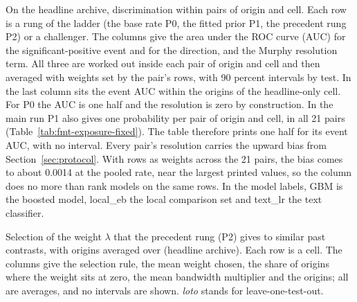 \begin{table}[tp]\centering\scriptsize
\caption{On the headline archive, discrimination within pairs of origin and cell. Each row is a rung of the ladder (the base rate P0, the fitted prior P1, the precedent rung P2) or a challenger. The columns give the area under the ROC curve (AUC) for the significant-positive event and for the direction, and the Murphy resolution term. All three are worked out inside each pair of origin and cell and then averaged with weights set by the pair's rows, with 90 percent intervals by test. In the last column sits the event AUC within the origins of the headline-only cell. For P0 the AUC is one half and the resolution is zero by construction. In the main run P1 also gives one probability per pair of origin and cell, in all 21 pairs (Table~\ref{tab:fmt-exposure-fixed}). The table therefore prints one half for its event AUC, with no interval. Every pair's resolution carries the upward bias from Section~\ref{sec:protocol}. With rows as weights across the 21 pairs, the bias comes to about 0.0014 at the pooled rate, near the largest printed values, so the column does no more than rank models on the same rows. In the model labels, GBM is the boosted model, local\_eb the local comparison set and text\_lr the text classifier.}
\label{tab:discrimination-within}
\resizebox{\columnwidth}{!}{}
\end{table}

\begin{table}[tp]\centering\small
\caption{Selection of the weight $\lambda$ that the precedent rung (P2) gives to similar past contrasts, with origins averaged over (headline archive). Each row is a cell. The columns give the selection rule, the mean weight chosen, the share of origins where the weight sits at zero, the mean bandwidth multiplier and the origins; all are averages, and no intervals are shown. \emph{loto} stands for leave-one-test-out.}
\label{tab:selection-upworthy}
\resizebox{\columnwidth}{!}{}
\end{table}

